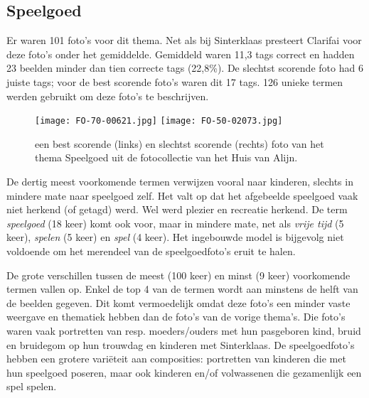 \subsection{Speelgoed}

Er waren 101 foto’s voor dit thema. Net als bij Sinterklaas presteert Clarifai voor deze foto’s onder het gemiddelde. Gemiddeld waren 11,3 tags correct en hadden 23 beelden minder dan tien correcte tags (22,8\%). De slechtst scorende foto had 6 juiste tags; voor de best scorende foto’s waren dit 17 tags. 126 unieke termen werden gebruikt om deze foto's te beschrijven.

\begin{figure}
	\centering
	\texttt{[image: FO-70-00621.jpg]}\hfill
	\texttt{[image: FO-50-02073.jpg]}\hfill
	\caption[Best en slechtst scorende foto van thema Speelgoed]{een best scorende (links) en slechtst scorende (rechts) foto van het thema Speelgoed uit de fotocollectie van het Huis van Alijn.}
\end{figure}

De dertig meest voorkomende termen verwijzen vooral naar kinderen, slechts in mindere mate naar speelgoed zelf. Het valt op dat het afgebeelde speelgoed vaak niet herkend (of getagd) werd. Wel werd plezier en recreatie herkend. De term \textit{speelgoed} (18 keer) komt ook voor, maar in mindere mate, net als \textit{vrije tijd} (5 keer), \textit{spelen} (5 keer) en \textit{spel} (4 keer). Het ingebouwde model is bijgevolg niet voldoende om het merendeel van de speelgoedfoto’s eruit te halen.

De grote verschillen tussen de meest (100 keer) en minst (9 keer) voorkomende termen vallen op. Enkel de top 4 van de termen wordt aan minstens de helft van de beelden gegeven. Dit komt vermoedelijk omdat deze foto’s een minder vaste weergave en thematiek hebben dan de foto’s van de vorige thema’s. Die foto’s waren vaak portretten van resp. moeders/ouders met hun pasgeboren kind, bruid en bruidegom op hun trouwdag en kinderen met Sinterklaas. De speelgoedfoto’s hebben een grotere variëteit aan composities: portretten van kinderen die met hun speelgoed poseren, maar ook kinderen en/of volwassenen die gezamenlijk een spel spelen. 

